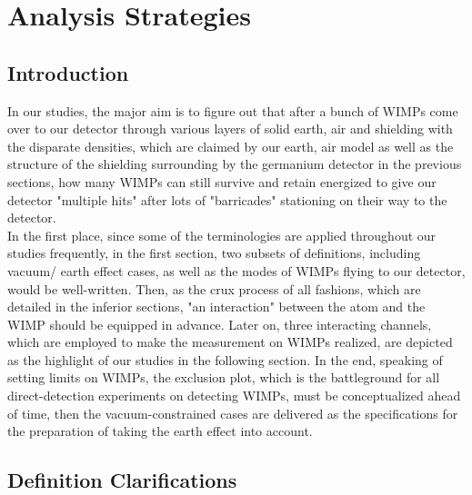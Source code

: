 
\chapter{Analysis Strategies}
\section{Introduction}
In our studies, the major aim is to figure out that after a bunch of WIMPs come over to our detector through various layers of solid earth, air and shielding with the disparate densities, which are claimed by our earth, air model as well as the structure of the shielding surrounding by the germanium detector in the previous sections, how many WIMPs can still survive and retain energized to give our detector "multiple hits" after lots of "barricades" stationing on their way to the detector.\\

In the first place, since some of the terminologies are applied throughout our studies frequently, in the first section, two subsets of definitions, including vacuum/ earth effect cases, as well as the modes of WIMPs flying to our detector, would be well-written. Then, as the crux process of all fashions, which are detailed in the inferior sections, "an interaction" between the atom and the WIMP should be equipped in advance. Later on, three interacting channels, which are employed to make the measurement on WIMPs realized, are depicted as the highlight of our studies in the following section. In the end, speaking of setting limits on WIMPs, the exclusion plot, which is the battleground for all direct-detection experiments on detecting WIMPs, must be conceptualized ahead of time, then the vacuum-constrained cases are delivered as the specifications for the preparation of taking the earth effect into account.

\section{Definition Clarifications}
